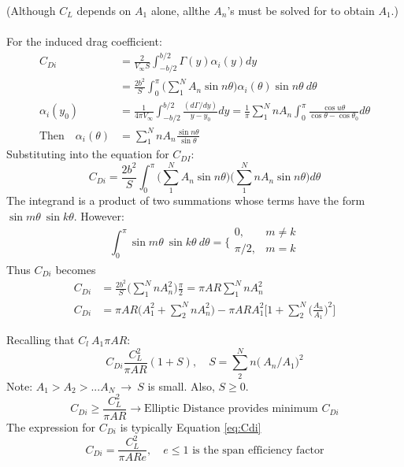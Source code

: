 \documentclass[draft=false, titlepage]{article}
\begin{document}
(Although $C_L$ depends on $A_1$ alone, allthe $A_n$'s must be solved for to obtain $A_1$.)

\paragraph*{} For the induced drag coefficient:
\begin{align*}
    C_{Di} &= \frac{2}{V_\infty S} \int_{-b/2}^{b/2} \Gamma(y) \alpha_i(y) dy\\
    &= \frac{2b^2}{S} \int_0^\pi \big( \sum_1^N A_n \sin n\theta\big) \alpha_i (\theta) \sin n\theta\ d\theta\\
    \alpha_i(y_0) &= \frac{1}{4\pi V_\infty} \int_{-b/2}^{b/2} \frac{(d\Gamma/dy)}{y-y_0} dy = \frac{1}{\pi}\sum_1^N nA_n \int_0^\pi \frac{\cos u\theta}{\cos\theta - \cos\theta_0}d\theta\\
    \text{Then} \quad \alpha_i(\theta) &= \sum_1^N nA_n \frac{\sin n\theta}{\sin\theta}
\end{align*}
Substituting into the equation for $C_{DI}$:
\begin{equation*}
    C_{Di} = \frac{2b^2}{S} \int_0^\pi \big( \sum_1^N A_n \sin n\theta \big) \big( \sum_1^N n A_n \sin n\theta\big) d\theta
\end{equation*}
The integrand is a product of two summations whose terms have the form $\sin m\theta\ \sin k\theta$. However:
\begin{equation*}
    \int_0^\pi \sin m\theta\ \sin k\theta\ d\theta =
    \Big\{\begin{matrix} 0, & m\neq k\\ \pi/2, & m=k\\\end{matrix}
\end{equation*}
Thus $C_{Di}$ becomes
\begin{align*}
    C_{Di} &= \frac{2b^2}{S} \Big( \sum_1^N n A_n^2\Big) \frac{\pi}{2}= \pi AR \sum_1^N n A_n^2\\
    C_{Di} &= \pi AR \Big( A_1^2 + \sum_2^N nA_n^2\Big) - \pi AR A_1^2 \Big[ 1 + \sum_2^N \big(\frac{A_n}{A_1}\big)^2 \Big]
\end{align*}

Recalling that $C_l \ A_1 \pi AR$:
\begin{equation*}
    C_{Di}  \frac{C_L^2}{\pi AR}(1+S), \quad S = \sum_2^N n\big(\ A_n/A_1\big)^2
\end{equation*}
Note: $A_1 > A_2 > ... A_N \ \rightarrow \ S$ is small. Also, $S \ge 0$.
\begin{equation*}
    \boxed{C_{Di} \ge \frac{C_L^2}{\pi AR} \rightarrow \text{Elliptic Distance provides minimum } C_{Di}}
\end{equation*}
The expression for $C_{Di}$ is typically Equation \ref{eq:Cdi}
\begin{equation}
    \boxed{C_{Di} = \frac{C_L^2}{\pi AR e},\quad e\le 1 \text{ is the span efficiency factor}}
    \label{eq:Cdi}
\end{equation}
\end{document}
